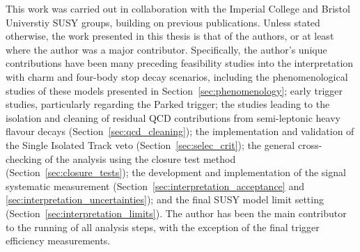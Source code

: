 

\begin{contribution}
\label{sec:contribution}
This work was carried out in collaboration
with the Imperial College and Bristol Universtiy SUSY groups, building on previous
publications. Unless stated otherwise, the work presented in this thesis is that
of the authors, or at least where the author was a major contributor. Specifically,
the author's unique contributions have been many preceding feasibility studies 
into the interpretation with charm
and four-body stop decay scenarios, including the phenomenological studies of these
models presented in Section~\ref{sec:phenomenology}; early trigger studies, particularly
regarding the Parked trigger; the studies leading to the
isolation and cleaning of residual QCD contributions from semi-leptonic heavy flavour
decays (Section~\ref{sec:qcd_cleaning}); the implementation and validation of the Single
Isolated Track veto (Section~\ref{sec:selec_crit}); the general cross-checking of the analysis
using the closure test method (Section~\ref{sec:closure_tests}); the
development and implementation of the signal systematic measurement (Section~\ref{sec:interpretation_acceptance} and
\ref{sec:interpretation_uncertainties}); and the final
SUSY model limit setting (Section~\ref{sec:interpretation_limits}). The author has been the
main contributor to the running of all analysis steps, with the exception of the
final trigger efficiency measurements.

\end{contribution}